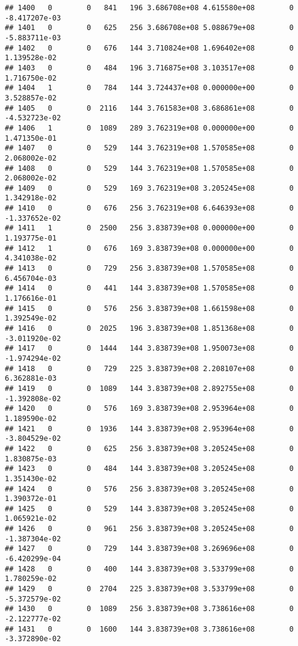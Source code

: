 \documentclass[
]{article}
\begin{document}
\begin{enumerate}
\begin{verbatim}
## 1400   0        0   841   196 3.686708e+08 4.615580e+08        0 -8.417207e-03
## 1401   0        0   625   256 3.686708e+08 5.088679e+08        0 -5.883711e-03
## 1402   0        0   676   144 3.710824e+08 1.696402e+08        0  1.139528e-02
## 1403   0        0   484   196 3.716875e+08 3.103517e+08        0  1.716750e-02
## 1404   1        0   784   144 3.724437e+08 0.000000e+00        0  3.528857e-02
## 1405   0        0  2116   144 3.761583e+08 3.686861e+08        0 -4.532723e-02
## 1406   1        0  1089   289 3.762319e+08 0.000000e+00        0  1.471350e-01
## 1407   0        0   529   144 3.762319e+08 1.570585e+08        0  2.068002e-02
## 1408   0        0   529   144 3.762319e+08 1.570585e+08        0  2.068002e-02
## 1409   0        0   529   169 3.762319e+08 3.205245e+08        0  1.342918e-02
## 1410   0        0   676   256 3.762319e+08 6.646393e+08        0 -1.337652e-02
## 1411   1        0  2500   256 3.838739e+08 0.000000e+00        0  1.193775e-01
## 1412   1        0   676   169 3.838739e+08 0.000000e+00        0  4.341038e-02
## 1413   0        0   729   256 3.838739e+08 1.570585e+08        0  6.456704e-03
## 1414   0        0   441   144 3.838739e+08 1.570585e+08        0  1.176616e-01
## 1415   0        0   576   256 3.838739e+08 1.661598e+08        0  1.392549e-02
## 1416   0        0  2025   196 3.838739e+08 1.851368e+08        0 -3.011920e-02
## 1417   0        0  1444   144 3.838739e+08 1.950073e+08        0 -1.974294e-02
## 1418   0        0   729   225 3.838739e+08 2.208107e+08        0  6.362881e-03
## 1419   0        0  1089   144 3.838739e+08 2.892755e+08        0 -1.392808e-02
## 1420   0        0   576   169 3.838739e+08 2.953964e+08        0  1.189590e-02
## 1421   0        0  1936   144 3.838739e+08 2.953964e+08        0 -3.804529e-02
## 1422   0        0   625   256 3.838739e+08 3.205245e+08        0  1.830875e-03
## 1423   0        0   484   144 3.838739e+08 3.205245e+08        0  1.351430e-02
## 1424   0        0   576   256 3.838739e+08 3.205245e+08        0  1.390372e-01
## 1425   0        0   529   144 3.838739e+08 3.205245e+08        0  1.065921e-02
## 1426   0        0   961   256 3.838739e+08 3.205245e+08        0 -1.387304e-02
## 1427   0        0   729   144 3.838739e+08 3.269696e+08        0 -6.420299e-04
## 1428   0        0   400   144 3.838739e+08 3.533799e+08        0  1.780259e-02
## 1429   0        0  2704   225 3.838739e+08 3.533799e+08        0 -5.372579e-02
## 1430   0        0  1089   256 3.838739e+08 3.738616e+08        0 -2.122777e-02
## 1431   0        0  1600   144 3.838739e+08 3.738616e+08        0 -3.372890e-02

\end{verbatim}
\end{enumerate}
\end{document}
